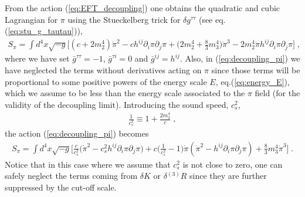 \documentclass[a4paper,11pt]{article}
\numberwithin{equation}{section}
\begin{document}
From the action (\ref{eq:EFT_decoupling}) one obtains the quadratic and cubic Lagrangian for $\pi$ using the Stueckelberg trick for $\delta g^{\tau\tau}$ (see eq.(\ref{eq:stu_g_tautau})), 
\begin{align}\label{eq:decoupling_pi}
S_{\pi} = \int d^4x \sqrt{-g} \bigg[(c + 2m_2^4)\dot{\pi}^2 - c h^{ij}\partial_i \pi \partial_j \pi + \bigg(2m_2^4 + \frac{8}{3} m_3^4\bigg)\dot{\pi}^3 - 2m_2^4 \dot{\pi} h^{ij}\partial_i \pi \partial_j \pi \bigg] \;,
\end{align}
where we have set $\bar{g}^{\tau\tau} = -1$, $\bar{g}^{\tau i} = 0$ and $\bar{g}^{ij} = h^{ij}$. Also, in (\ref{eq:decoupling_pi}) we have neglected the terms without derivatives acting on $\pi$ since those terms will be proportional to some positive powers of the energy scale $E$, eq.(\ref{eq:energy_E}), which we assume to be less than the energy scale associated to the $\pi$ field (for the validity of the decoupling limit). Introducing the sound speed, $c_s^2$,
\begin{align}\label{eq:c_s_decoupling}
\frac{1}{c_s^2} \equiv 1 + \frac{2m_2^4}{c} \;,
\end{align}
the action (\ref{eq:decoupling_pi}) becomes 
\begin{align}
S_\pi = \int d^4x \sqrt{-g} \bigg[\frac{c}{c_s^2}\bigg(\dot{\pi}^2 - c_s^2 h^{ij}\partial_i \pi \partial_j \pi \bigg) + c  \bigg(\frac{1}{c_s^2} - 1 \bigg) \dot{\pi} (\dot{\pi}^2 - h^{ij} \partial_i \pi \partial_j \pi) + \frac{8}{3} m_3^4 \dot{\pi}^3 \bigg] \;.
\end{align}
Notice that in this case where we assume that $c_s^2$ is not close to zero, one can safely neglect the terms coming from $\delta K$ or $\delta {}^{(3)}\!R$ since they are further suppressed by the cut-off scale.
\end{document}

